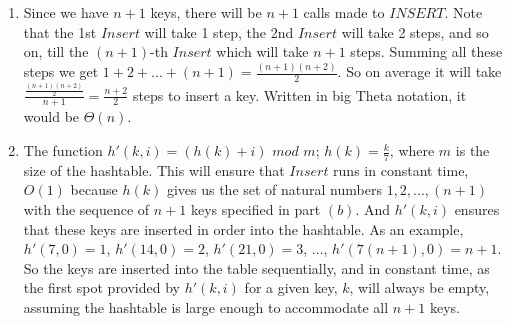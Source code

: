 \documentclass{article}
\begin{document}
\begin{enumerate}[label=(\alph*)]
\item Since we have $n+1$ keys, there will be $n+1$ calls made to $INSERT$. Note that the 1st $Insert$ will take 1 step, the 2nd $Insert$ will take 2 steps, and so on, till the $(n+1)$-th $Insert$ which will take $n+1$ steps. Summing all these steps we get $1 + 2 + ... + (n+1) = \frac{(n+1)(n+2)}{2}$. So on average it will take $\frac{\frac{(n+1)(n+2)}{2}}{n+1} = \frac{n+2}{2}$ steps to insert a key. Written in big Theta notation, it would be $\Theta(n)$.

\item The function $h'(k,i)= (h(k)+i)$ $mod$ $m$; $h(k) = \frac{k}{7}$, where $m$ is the size of the hashtable. This will ensure that $Insert$ runs in constant time, $O(1)$ because $h(k)$ gives us the set of natural numbers ${1, 2, ..., (n+1)}$ with the sequence of $n+1$ keys specified in part $(b)$. And $h'(k,i)$ ensures that these keys are inserted in order into the hashtable. As an example, $h'(7, 0) = 1$, $h'(14, 0) = 2$, $h'(21, 0) = 3$, ..., $h'(7(n+1), 0) = n+1$. So the keys are inserted into the table sequentially, and in constant time, as the first spot provided by $h'(k,i)$ for a given key, $k$, will always be empty, assuming the hashtable is large enough to accommodate all $n+1$ keys.


\end{enumerate}
\end{document}
